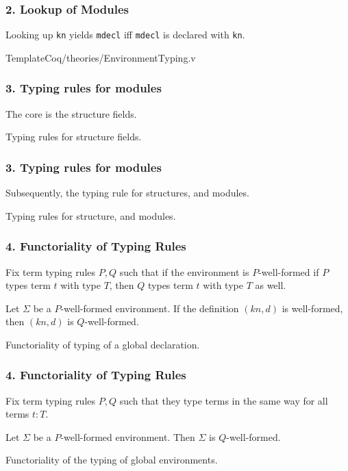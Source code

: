 \begin{frame}
  \frametitle{2. Lookup of Modules}
  \begin{theorem}[Lookup]
  Looking up \texttt{kn} yields \texttt{mdecl} iff \texttt{mdecl} is declared
  with \texttt{kn}.
  \end{theorem}
\begin{listing}[H]
  \caption{TemplateCoq/theories/EnvironmentTyping.v}
\end{listing}
\end{frame}
  
\begin{frame}
  \frametitle{3. Typing rules for modules}
  The core is the structure fields.
  \begin{listing}[H]
    \caption{Typing rules for structure fields.}
\end{listing}
\end{frame}

\begin{frame}
  \frametitle{3. Typing rules for modules}
  Subsequently, the typing rule for structures, and modules.
  \begin{listing}[H]
    \caption{Typing rules for structure, and modules.}
\end{listing}
\end{frame}

\begin{frame}
  \frametitle{4. Functoriality of Typing Rules}
  \begin{lemma}
    Fix term typing rules $P,Q$ such that if the environment is $P$-well-formed
    if $P$ types term $t$ with type $T$, then $Q$ types term $t$ with type $T$
    as well.
    
    Let $\Sigma$ be a $P$-well-formed environment. If the definition $(kn,d)$ is
    well-formed, then $(kn,d)$ is $Q$-well-formed.
  \end{lemma}
  \begin{listing}[H]
    \caption{Functoriality of typing of a global declaration.}
  \end{listing}
\end{frame}

\begin{frame}
  \frametitle{4. Functoriality of Typing Rules}
  \begin{theorem}
    Fix term typing rules $P,Q$ such that they type terms in the same way for
    all terms $t:T$.
    
    Let $\Sigma$ be a $P$-well-formed environment. Then $\Sigma$ is
    $Q$-well-formed.
  \end{theorem}
  \begin{listing}[H]
    \caption{Functoriality of the typing of global environments.}
  \end{listing}
\end{frame}


